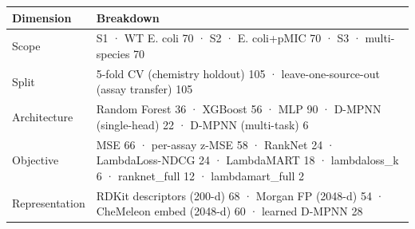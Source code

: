 \begin{tabular}{ll}
\toprule
Dimension & Breakdown \\
\midrule
Scope & S1 · WT E. coli 70 · S2 · E. coli+pMIC 70 · S3 · multi-species 70 \\
Split & 5-fold CV (chemistry holdout) 105 · leave-one-source-out (assay transfer) 105 \\
Architecture & Random Forest 36 · XGBoost 56 · MLP 90 · D-MPNN (single-head) 22 · D-MPNN (multi-task) 6 \\
Objective & MSE 66 · per-assay z-MSE 58 · RankNet 24 · LambdaLoss-NDCG 24 · LambdaMART 18 · lambdaloss_k 6 · ranknet_full 12 · lambdamart_full 2 \\
Representation & RDKit descriptors (200-d) 68 · Morgan FP (2048-d) 54 · CheMeleon embed (2048-d) 60 · learned D-MPNN 28 \\
\bottomrule
\end{tabular}
